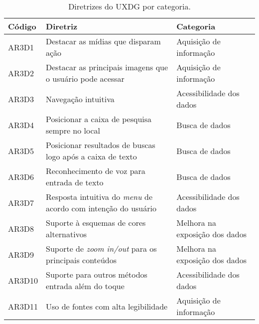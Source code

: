 \begin{table}[htb]
  \begin{center}
    \ABNTEXfontereduzida
    \caption{Diretrizes do UXDG por categoria.}
    \label{tab-acc-dir-uxd-1}
    \begin{tabular}{p{1.2cm}|p{8.8cm}|p{4.5cm}}
      \textbf{Código} & \textbf{Diretriz}                                                   & \textbf{Categoria}             \\
      \hline
      AR3D1           & Destacar as mídias que disparam ação                                & Aquisição de informação        \\
      \hline
      AR3D2           & Destacar as principais imagens que o usuário pode acessar           & Aquisição de informação        \\
      \hline
      AR3D3           & Navegação intuitiva                                                 & Acessibilidade dos dados       \\
      \hline
      AR3D4           & Posicionar a caixa de pesquisa sempre no local                      & Busca de dados                 \\
      \hline
      AR3D5           & Posicionar resultados de buscas logo após a caixa de texto          & Busca de dados                 \\
      \hline
      AR3D6           & Reconhecimento de voz para entrada de texto                         & Busca de dados                 \\
      \hline
      AR3D7           & Resposta intuitiva do \emph{menu} de acordo com intenção do usuário & Acessibilidade dos dados       \\
      \hline
      AR3D8           & Suporte à esquemas de cores alternativos                            & Melhora na exposição dos dados \\
      \hline
      AR3D9           & Suporte de \emph{zoom in/out} para os principais conteúdos          & Melhora na exposição dos dados \\
      \hline
      AR3D10          & Suporte para outros métodos entrada além do toque                   & Acessibilidade dos dados       \\
      \hline
      AR3D11          & Uso de fontes com alta legibilidade                                 & Aquisição de informação        \\
    \end{tabular}
  \end{center}
\end{table}

